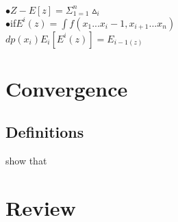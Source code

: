 \documentclass[journal,12pt,twocolumn]{IEEEtran}
\begin{document}
$\bullet Z-E[z]= \Sigma_{1=1}^{n} \vartriangle_i$\\

$\bullet$if$E^i(z)= \int f(x_1...x_i-1,x_{i+1}...x_n)$\\

 $dp(x_i) E_i[E^i(z)]=E_{i-1(z)}$\\

\section{Convergence}
\subsection{Definitions}
show that\\
\section{Review}
\end{document}
